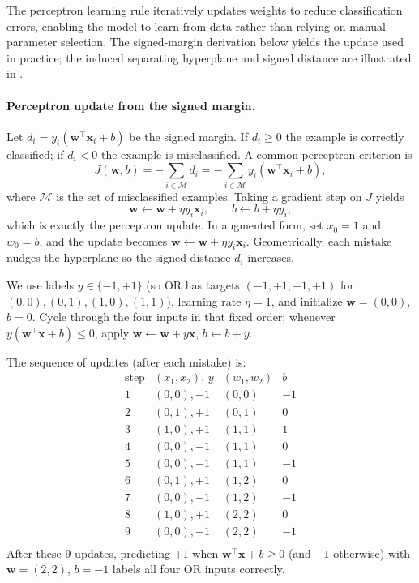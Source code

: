 The perceptron learning rule iteratively updates weights to reduce classification errors, enabling the model to learn from data rather than relying on manual parameter selection. The signed-margin derivation below yields the update used in practice; the induced separating hyperplane and signed distance are illustrated in .

\paragraph{Perceptron update from the signed margin.} Let \(d_i = y_i(\mathbf{w}^\top \mathbf{x}_i + b)\) be the signed margin. If \(d_i \ge 0\) the example is correctly classified; if \(d_i < 0\) the example is misclassified. A common perceptron criterion is
\[
J(\mathbf{w}, b) = - \sum_{i \in \mathcal{M}} d_i = - \sum_{i \in \mathcal{M}} y_i (\mathbf{w}^\top \mathbf{x}_i + b),
\]
where \(\mathcal{M}\) is the set of misclassified examples. Taking a gradient step on \(J\) yields
\[
\mathbf{w} \leftarrow \mathbf{w} + \eta y_i \mathbf{x}_i,\qquad
b \leftarrow b + \eta y_i,
\]
which is exactly the perceptron update. In augmented form, set \(x_0=1\) and \(w_0=b\), and the update becomes \(\mathbf{w} \leftarrow \mathbf{w} + \eta y_i \mathbf{x}_i\). Geometrically, each mistake nudges the hyperplane so the signed distance \(d_i\) increases.

\begin{tcolorbox}[summarybox, title={Worked example: learning an OR gate by mistake-driven updates}]
We use labels \(y\in\{-1,+1\}\) (so OR has targets \((-1,+1,+1,+1)\) for \((0,0),(0,1),(1,0),(1,1)\)),
learning rate \(\eta=1\), and initialize \(\mathbf{w}=(0,0)\), \(b=0\). Cycle through the four inputs in that
fixed order; whenever \(y(\mathbf{w}^\top\mathbf{x}+b)\le 0\), apply \(\mathbf{w}\leftarrow \mathbf{w}+y\mathbf{x}\),
\(b\leftarrow b+y\).

\medskip
\noindent The sequence of updates (after each mistake) is:
\[
\begin{array}{r|c|c|c}
\text{step} & (x_1,x_2),\,y & (w_1,w_2) & b \\
\hline
1 & (0,0),-1 & (0,0) & -1\\
2 & (0,1),+1 & (0,1) & 0\\
3 & (1,0),+1 & (1,1) & 1\\
4 & (0,0),-1 & (1,1) & 0\\
5 & (0,0),-1 & (1,1) & -1\\
6 & (0,1),+1 & (1,2) & 0\\
7 & (0,0),-1 & (1,2) & -1\\
8 & (1,0),+1 & (2,2) & 0\\
9 & (0,0),-1 & (2,2) & -1\\
\end{array}
\]
After these 9 updates, predicting \(+1\) when \(\mathbf{w}^\top\mathbf{x}+b\ge 0\) (and \(-1\) otherwise) with
\(\mathbf{w}=(2,2)\), \(b=-1\) labels all four OR inputs correctly.
\end{tcolorbox}

